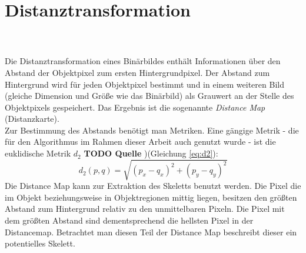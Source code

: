 \section{Distanztransformation}
\\\\
Die Distanztransformation eines Binärbildes enthält Informationen über den Abstand der Objektpixel zum ersten Hintergrundpixel. Der Abstand zum Hintergrund wird für jeden Objektpixel bestimmt und in einem
weiteren Bild (gleiche Dimension und Größe wie das Binärbild) als Grauwert an der Stelle des Objektpixels gespeichert. Das Ergebnis ist die sogenannte \emph{Distance Map} (Distanzkarte). \\
Zur Bestimmung des Abstands benötigt man Metriken. Eine gängige Metrik - die für den Algorithmus im Rahmen dieser Arbeit auch genutzt wurde - ist die euklidische Metrik $d_2$ \textbf{TODO Quelle} )(Gleichung \ref{eq:d2}):
\begin{equation}
\label{eq:d2}
d_2(p,q) = \sqrt{(p_x - q_x)^2 + (p_y - q_y)^2}  
\end{equation}
Die Distance Map kann zur Extraktion des Skeletts benutzt werden. Die
Pixel die im Objekt beziehungsweise in Objektregionen mittig liegen, besitzen den größten Abstand zum Hintergrund relativ zu den unmittelbaren Pixeln. Die Pixel mit dem größten Abstand sind dementsprechend die hellsten Pixel in der Distancemap. Betrachtet man diesen Teil der Distance Map beschreibt dieser ein potentielles Skelett.
\label{sec:distanztransformation}
